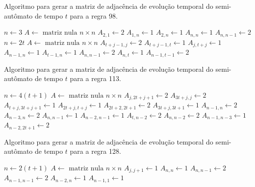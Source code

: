 \documentclass[12pt,a4paper]{article}
\begin{document}
\begin{algorithm}[H]
\caption{Algoritmo para gerar a matriz de adjacência de evolução temporal do
semi-autômato de tempo $t$ para a regra 98.}
\label{alg:r98}
\begin{algorithmic}
    \STATE $n \leftarrow 3$
    \STATE $A \leftarrow \mbox{ matriz nula } n \times n$
    \STATE $A_{2,1} \leftarrow 2$
    \STATE $A_{1,n} \leftarrow 1$
    \STATE $A_{2,n} \leftarrow 1$
    \STATE $A_{n,n} \leftarrow 1$
    \STATE $A_{n,n-1} \leftarrow 2$
\ELSE
    \STATE $n \leftarrow 2t$
    \STATE $A \leftarrow \mbox{ matriz nula } n \times n$
        \STATE $A_{t+j-1,j} \leftarrow 2$
        \STATE $A_{t+j-1,t} \leftarrow 1$
    \ENDFOR
            \STATE $A_{j,t+j} \leftarrow 1$
        \ENDFOR
    \ENDIF
    \STATE $A_{n-1,n} \leftarrow 1$
    \STATE $A_{t-1,n} \leftarrow 1$
    \STATE $A_{n,n-1} \leftarrow 2$
    \STATE $A_{n,t} \leftarrow 1$
    \STATE $A_{n-1,t-1} \leftarrow 2$
\ENDIF
\end{algorithmic}
\end{algorithm}

\begin{algorithm}[H]
\caption{Algoritmo para gerar a matriz de adjacência de evolução temporal do
semi-autômato de tempo $t$ para a regra 113.}
\label{alg:r113}
\begin{algorithmic}
\STATE $n \leftarrow 4(t+1)$
\STATE $A \leftarrow \mbox{ matriz nula } n \times n$
        \STATE $A_{j,2t+j+1} \leftarrow 2$
    \ENDFOR
\ENDIF
{}
    \STATE $A_{3t+j,j} \leftarrow 2$
    \STATE $A_{t+j,3t+j+1} \leftarrow 1$
    \STATE $A_{2t+j,t+j} \leftarrow 1$
    \STATE $A_{2t+2,2t+1} \leftarrow 2$
\ENDFOR
{}
    \STATE $A_{3t+j,3t+1} \leftarrow 1$
\ENDFOR
\STATE $A_{n-1,n} \leftarrow 2$
\STATE $A_{n-3,n} \leftarrow 2$
\STATE $A_{n,n-1} \leftarrow 1$
\STATE $A_{n-2,n-1} \leftarrow 1$
\STATE $A_{t,n-2} \leftarrow 2$
\STATE $A_{n,n-2} \leftarrow 2$
\STATE $A_{n-1,n-3} \leftarrow 1$
\STATE $A_{n-2,2t+1} \leftarrow 2$
\end{algorithmic}
\end{algorithm}

\begin{algorithm}[H]
\caption{Algoritmo para gerar a matriz de adjacência de evolução temporal do
semi-autômato de tempo $t$ para a regra 128.}
\label{alg:r128}
\begin{algorithmic}
\STATE $n \leftarrow 2(t+1)$
\STATE $A \leftarrow \mbox{ matriz nula } n \times n$
    \STATE $A_{j,j+1} \leftarrow 1$
\ENDFOR
\STATE $A_{n,n} \leftarrow 1$
\STATE $A_{n,n-1} \leftarrow 2$
\STATE $A_{n-1,n-1} \leftarrow 2$
\STATE $A_{n-2,n} \leftarrow 1$
\STATE $A_{n-1,1} \leftarrow 1$
\end{algorithmic}
\end{algorithm}
\end{document}
